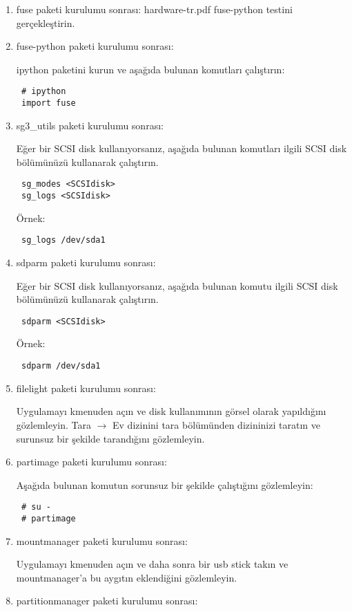 \documentclass[a4paper,10pt]{article}
\begin{document}
\begin{enumerate}
\item fuse paketi kurulumu sonrası:
hardware-tr.pdf fuse-python testini gerçekleştirin.

\item fuse-python paketi kurulumu sonrası:

ipython paketini kurun ve aşağıda bulunan komutları çalıştırın:
\begin{verbatim}
 # ipython
 import fuse
\end{verbatim}

\item sg3\_utils  paketi kurulumu sonrası:

Eğer bir SCSI disk kullanıyorsanız, aşağıda bulunan komutları ilgili SCSI disk bölümünüzü kullanarak çalıştırın.
\begin{verbatim}
 sg_modes <SCSIdisk>
 sg_logs <SCSIdisk>
\end{verbatim}

Örnek:
\begin{verbatim}
 sg_logs /dev/sda1
\end{verbatim}

\item sdparm paketi kurulumu sonrası:

Eğer bir SCSI disk kullanıyorsanız, aşağıda bulunan komutu ilgili SCSI disk bölümünüzü kullanarak çalıştırın.
\begin{verbatim}
 sdparm <SCSIdisk>
\end{verbatim}

Örnek:
\begin{verbatim}
 sdparm /dev/sda1
\end{verbatim}


\item filelight paketi kurulumu sonrası:

Uygulamayı kmenuden açın ve disk kullanımının görsel olarak yapıldığını gözlemleyin. Tara $\rightarrow$ Ev dizinini tara bölümünden dizininizi taratın ve surunsuz bir şekilde tarandığını gözlemleyin.
 \item partimage paketi kurulumu sonrası:

Aşağıda bulunan komutun sorunsuz bir şekilde çalıştığını gözlemleyin:
\begin{verbatim}
 # su -
 # partimage
\end{verbatim}

 \item mountmanager paketi kurulumu sonrası:

Uygulamayı kmenuden açın ve daha sonra bir usb stick takın ve mountmanager'a bu aygıtın eklendiğini gözlemleyin.
 \item partitionmanager paketi kurulumu sonrası:


\end{enumerate}
\end{document}
